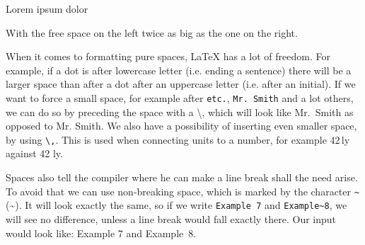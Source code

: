 Lorem \hfill \hfill ipsum \hfill dolor

With the free space on the left twice as big as the one on the right.

When it comes to formatting pure spaces, LaTeX has a lot of freedom. For example, if a dot is after lowercase letter (i.e. ending a sentence) there will be a larger space than after a dot after an uppercase letter (i.e. after an initial). If we want to force a small space, for example after \verb|etc.|, \verb|Mr. Smith| and a lot others, we can do so by preceding the space with a \textbackslash, which will look like Mr.\ Smith as opposed to Mr. Smith. We also have a possibility of inserting even smaller space, by using \verb|\,|. This is used when connecting units to a number, for example 42\,ly against 42 ly.

Spaces also tell the compiler where he can make a line break shall the need arise. To avoid that we can use non-breaking space, which is marked by the character \verb|~| (\textasciitilde{}). It will look exactly the same, so if we write \verb|Example 7| and \verb|Example~8|, we will see no difference, unless a line break would fall exactly there. Our input would look like: Example 7 and Example~8.
